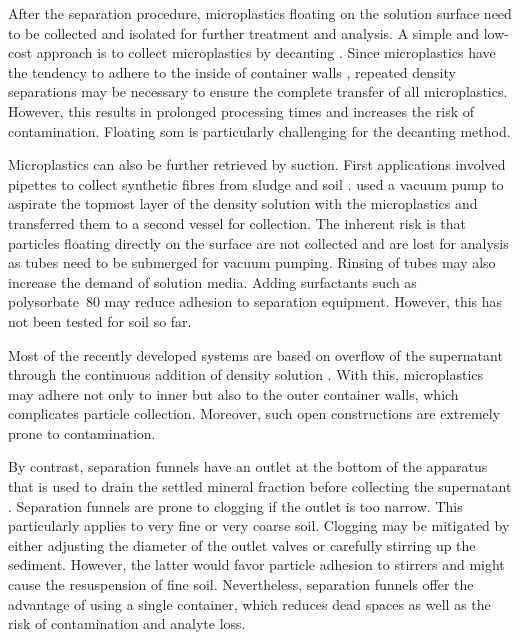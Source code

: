After the separation procedure, microplastics floating on the solution surface need to be collected and isolated for further treatment and analysis. A simple and low-cost approach is to collect microplastics by decanting \citep{BesleyStandardized2017,HuangAgricultural2020,ZhangSimple2018,ScheurerMicroplastics2018}. Since microplastics have the tendency to adhere to the inside of container walls \citep{NakajimaSmall2019}, repeated density separations may be necessary to ensure the complete transfer of all microplastics. However, this results in prolonged processing times and increases the risk of contamination. Floating \ac{som} is particularly challenging for the decanting method.

Microplastics can also be further retrieved by suction. First applications involved pipettes to collect synthetic fibres from sludge and soil \citep{ZubrisSynthetic2005,Prendergast-MillerPolyesterderived2019}. \citet{ScheurerMicroplastics2018} used a vacuum pump to aspirate the topmost layer of the density solution with the microplastics and transferred them to a second vessel for collection.
The inherent risk is that particles floating directly on the surface are not collected and are lost for analysis as tubes need to be submerged for vacuum pumping. Rinsing of tubes may also increase the demand of solution media. Adding surfactants such as polysorbate~80
\citep{EndersWhen2020} may reduce adhesion to separation equipment.
However, this has not been tested for soil so far.

Most of the recently developed systems are based on overflow of the supernatant through the continuous addition of density solution \citep{NuelleNew2014,ZhouMicroplastics2020,VermeirenMicroplastic2020,WangPoor2018,LiuMicroplastic2018,LiuMethod2019,HanOptimized2019}. With this, microplastics may adhere not only to inner but also to the outer container walls, which complicates particle collection. Moreover, such open constructions are extremely prone to contamination.

By contrast, separation funnels have an outlet at the bottom of the apparatus that is used to drain the settled mineral fraction before collecting the supernatant \citep{WangPoor2018,NuelleNew2014,MahonMicroplastics2017}. Separation funnels are prone to clogging if the outlet is too narrow. This particularly applies to very fine or very coarse soil. Clogging may be mitigated by either adjusting the diameter of the outlet valves \citep{EndersWhen2020} or carefully stirring up the sediment. However, the latter would favor particle adhesion to stirrers and might cause the resuspension of fine soil. Nevertheless, separation funnels offer the advantage of using a single container, which reduces dead spaces as well as the risk of contamination and analyte loss.

